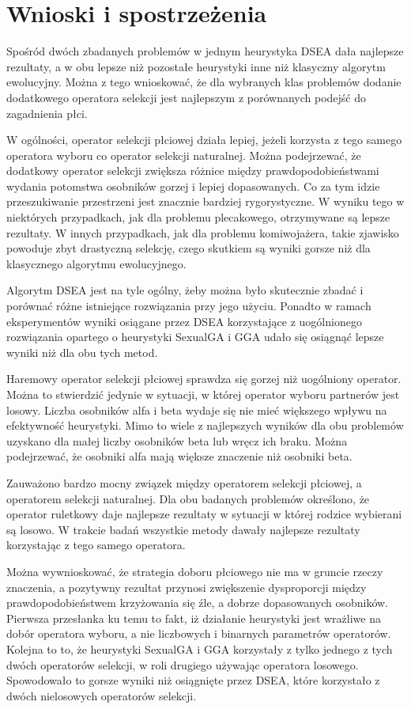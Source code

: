 \documentclass[./FM_mgr.tex]{subfiles}
\begin{document}
\chapter{Wnioski i spostrzeżenia}

Spośród dwóch zbadanych problemów w jednym heurystyka DSEA dała najlepsze rezultaty, a w obu lepsze niż pozostałe heurystyki inne niż klasyczny algorytm ewolucyjny.
Można z tego wnioskować, że dla wybranych klas problemów dodanie dodatkowego operatora selekcji jest najlepszym z porównanych podejść do zagadnienia płci.

W ogólności, operator selekcji płciowej działa lepiej, jeżeli korzysta z tego samego operatora wyboru co operator selekcji naturalnej.
Można podejrzewać, że dodatkowy operator selekcji zwiększa różnice między prawdopodobieństwami wydania potomstwa osobników gorzej i lepiej dopasowanych.
Co za tym idzie przeszukiwanie przestrzeni jest znacznie bardziej rygorystyczne.
W wyniku tego w niektórych przypadkach, jak dla problemu plecakowego, otrzymywane są lepsze rezultaty.
W innych przypadkach, jak dla problemu komiwojażera, takie zjawisko powoduje zbyt drastyczną selekcję, czego skutkiem są wyniki gorsze niż dla klasycznego algorytmu ewolucyjnego.

Algorytm DSEA jest na tyle ogólny, żeby można było skutecznie zbadać i porównać różne istniejące rozwiązania przy jego użyciu.
Ponadto w ramach eksperymentów wyniki osiągane przez DSEA korzystające z uogólnionego rozwiązania opartego o heurystyki SexualGA i GGA udało się osiągnąć lepsze wyniki niż dla obu tych metod.

Haremowy operator selekcji płciowej sprawdza się gorzej niż uogólniony operator.
Można to stwierdzić jedynie w sytuacji, w której operator wyboru partnerów jest losowy.
Liczba osobników alfa i beta wydaje się nie mieć większego wpływu na efektywność heurystyki.
Mimo to wiele z najlepszych wyników dla obu problemów uzyskano dla małej liczby osobników beta lub wręcz ich braku.
Można podejrzewać, że osobniki alfa mają większe znaczenie niż osobniki beta.

Zauważono bardzo mocny związek między operatorem selekcji płciowej, a operatorem selekcji naturalnej.
Dla obu badanych problemów określono, że operator ruletkowy daje najlepsze rezultaty w sytuacji w której rodzice wybierani są losowo.
W trakcie badań wszystkie metody dawały najlepsze rezultaty korzystając z tego samego operatora.

Można wywnioskować, że strategia doboru płciowego nie ma w gruncie rzeczy znaczenia, a pozytywny rezultat przynosi zwiększenie dysproporcji między prawdopodobieństwem krzyżowania się źle, a dobrze dopasowanych osobników.
Pierwsza przesłanka ku temu to fakt, iż działanie heurystyki jest wrażliwe na dobór operatora wyboru, a nie liczbowych i binarnych parametrów operatorów.
Kolejna to to, że heurystyki SexualGA i GGA korzystały z tylko jednego z tych dwóch operatorów selekcji, w roli drugiego używając operatora losowego.
Spowodowało to gorsze wyniki niż osiągnięte przez DSEA, które korzystało z dwóch nielosowych operatorów selekcji.
\end{document}
